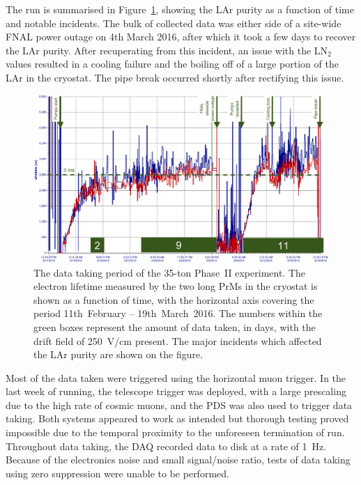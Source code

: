 The run is summarised in Figure~\ref{fig:35tonPhaseIIData}, showing the LAr purity as a function of time and notable incidents.  The bulk of collected data was either side of a site-wide FNAL power outage on 4th March 2016, after which it took a few days to recover the LAr purity.  After recuperating from this incident, an issue with the LN$_2$ values resulted in a cooling failure and the boiling off of a large portion of the LAr in the cryostat.  The pipe break occurred shortly after rectifying this issue.%

\begin{figure}
  \centering
  \includegraphics[width=14cm]{35tonPhaseIIDataEdit.png}
  \caption[The data taking period of the 35-ton Phase~II experiment.]{The data taking period of the 35-ton Phase~II experiment.  The electron lifetime measured by the two long PrMs in the cryostat is shown as a function of time, with the horizontal axis covering the period 11th~February -- 19th~March~2016.  The numbers within the green boxes represent the amount of data taken, in days, with the drift field of 250~V/cm present.  The major incidents which affected the LAr purity are shown on the figure.}
  \label{fig:35tonPhaseIIData}
\end{figure}

Most of the data taken were triggered using the horizontal muon trigger.  In the last week of running, the telescope trigger was deployed, with a large prescaling due to the high rate of cosmic muons, and the PDS was also used to trigger data taking.  Both systems appeared to work as intended but thorough testing proved impossible due to the temporal proximity to the unforeseen termination of run.  Throughout data taking, the DAQ recorded data to disk at a rate of 1~Hz.  Because of the electronics noise and small signal/noise ratio, tests of data taking using zero suppression were unable to be performed.

